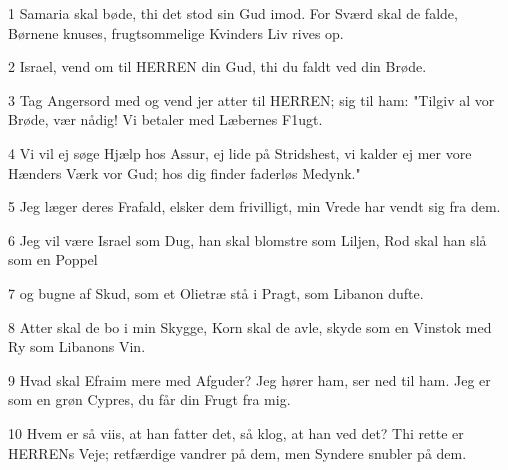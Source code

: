 \par 1 Samaria skal bøde, thi det stod sin Gud imod. For Sværd skal de falde, Børnene knuses, frugtsommelige Kvinders Liv rives op.
\par 2 Israel, vend om til HERREN din Gud, thi du faldt ved din Brøde.
\par 3 Tag Angersord med og vend jer atter til HERREN; sig til ham: "Tilgiv al vor Brøde, vær nådig! Vi betaler med Læbernes F1ugt.
\par 4 Vi vil ej søge Hjælp hos Assur, ej lide på Stridshest, vi kalder ej mer vore Hænders Værk vor Gud; hos dig finder faderløs Medynk."
\par 5 Jeg læger deres Frafald, elsker dem frivilligt, min Vrede har vendt sig fra dem.
\par 6 Jeg vil være Israel som Dug, han skal blomstre som Liljen, Rod skal han slå som en Poppel
\par 7 og bugne af Skud, som et Olietræ stå i Pragt, som Libanon dufte.
\par 8 Atter skal de bo i min Skygge, Korn skal de avle, skyde som en Vinstok med Ry som Libanons Vin.
\par 9 Hvad skal Efraim mere med Afguder? Jeg hører ham, ser ned til ham. Jeg er som en grøn Cypres, du får din Frugt fra mig.
\par 10 Hvem er så viis, at han fatter det, så klog, at han ved det? Thi rette er HERRENs Veje; retfærdige vandrer på dem, men Syndere snubler på dem.


